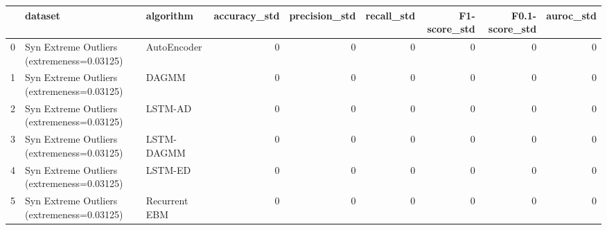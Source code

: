 \begin{tabular}{rllrrrrrr}
\hline
    & dataset                                    & algorithm     &   accuracy\_std &   precision\_std &   recall\_std &   F1-score\_std &   F0.1-score\_std &   auroc\_std \\
\hline
  0 & Syn Extreme Outliers (extremeness=0.03125) & AutoEncoder   &              0 &               0 &            0 &              0 &                0 &           0 \\
  1 & Syn Extreme Outliers (extremeness=0.03125) & DAGMM         &              0 &               0 &            0 &              0 &                0 &           0 \\
  2 & Syn Extreme Outliers (extremeness=0.03125) & LSTM-AD       &              0 &               0 &            0 &              0 &                0 &           0 \\
  3 & Syn Extreme Outliers (extremeness=0.03125) & LSTM-DAGMM    &              0 &               0 &            0 &              0 &                0 &           0 \\
  4 & Syn Extreme Outliers (extremeness=0.03125) & LSTM-ED       &              0 &               0 &            0 &              0 &                0 &           0 \\
  5 & Syn Extreme Outliers (extremeness=0.03125) & Recurrent EBM &              0 &               0 &            0 &              0 &                0 &           0 \\
\hline
\end{tabular}

